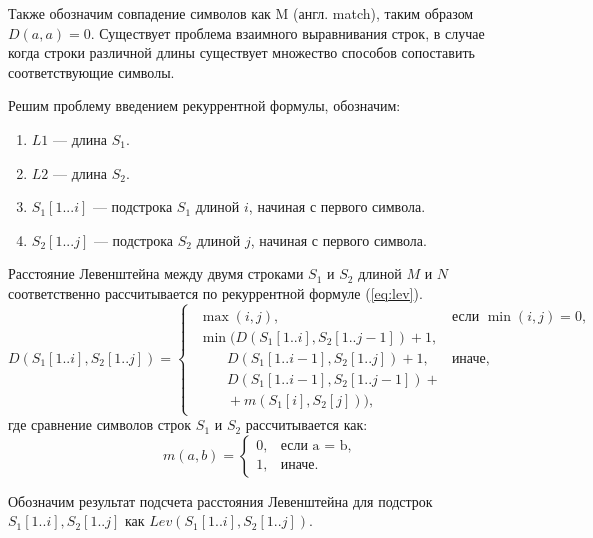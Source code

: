 Также обозначим совпадение символов как M (англ. match), таким образом $D(a,a) = 0$.
Существует  проблема взаимного выравнивания строк, в случае когда строки различной длины существует множество способов сопоставить соответствующие символы.

Решим проблему введением рекуррентной формулы, обозначим:
\begin{enumerate}
	\item $L1$ --- длина $S_{1}$.
	\item $L2$ --- длина $S_{2}$.
	\item $S_{1}[1...i]$ --- подстрока $S_{1}$ длиной $i$, начиная с первого символа.
	\item $S_{2}[1...j]$ --- подстрока $S_{2}$ длиной $j$, начиная с первого символа.
\end{enumerate}



Расстояние Левенштейна между двумя строками $S_{1}$ и $S_{2}$ длиной $M$ и $N$ соответственно рассчитывается по рекуррентной формуле (\ref{eq:lev}).
\small
\begin{equation}
	\label{eq:lev}
	D(S_{1}[1..i],S_{2}[1..j]) = 
	\begin{cases}
		\begin{array}{ll}
			\max(i,j), & \textrm{$\mbox{если }\min(i,j) = 0,$}\\
			\min(D(S_{1}[1..i], S_{2}[1.. j - 1])+1,\\
			\qquad D(S_{1}[1..i - 1], S_{2}[1..j]) + 1, &\textrm{$\mbox{иначе},$}\\
			\qquad D(S_{1}[1..i - 1], S_{2}[1..j - 1]) +\\
			\qquad + m(S_{1}[i],S_{2}[j])),
		\end{array}
	\end{cases}
\end{equation}
где сравнение символов строк $S_{1}$ и $S_{2}$ рассчитывается как:
\small
\begin{equation}
	\label{eq:m}
	m(a, b) = \begin{cases}
		0, &\text{если a = b,}\\
		1, &\text{иначе.}
	\end{cases}
\end{equation}


Обозначим результат подсчета расстояния Левенштейна для подстрок $S_{1}[1..i],S_{2}[1..j]$ как 
$Lev(S_{1}[1..i],S_{2}[1..j])$.





